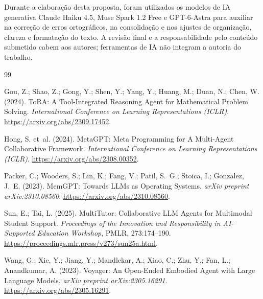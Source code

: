 \documentclass[12pt]{article}
\begin{document}
Durante a elaboração desta proposta, foram utilizados os modelos de IA generativa Claude Haiku 4.5, Muse Spark 1.2 Free e GPT-6-Astra para auxiliar na correção de erros ortográficos, na consolidação e nos ajustes de organização, clareza e formatação do texto. A revisão final e a responsabilidade pelo conteúdo submetido cabem aos autores; ferramentas de IA não integram a autoria do trabalho.
\clearpage
\begin{thebibliography}{99}

Gou, Z.; Shao, Z.; Gong, Y.; Shen, Y.; Yang, Y.; Huang, M.; Duan, N.; Chen, W. (2024).
\newblock ToRA: A Tool-Integrated Reasoning Agent for Mathematical Problem Solving.
\newblock \textit{International Conference on Learning Representations (ICLR)}.
\newblock \url{https://arxiv.org/abs/2309.17452}.

Hong, S. et~al. (2024).
\newblock MetaGPT: Meta Programming for A Multi-Agent Collaborative Framework.
\newblock \textit{International Conference on Learning Representations (ICLR)}.
\newblock \url{https://arxiv.org/abs/2308.00352}.

Packer, C.; Wooders, S.; Lin, K.; Fang, V.; Patil, S.~G.; Stoica, I.; Gonzalez, J.~E. (2023).
\newblock MemGPT: Towards LLMs as Operating Systems.
\newblock \textit{arXiv preprint arXiv:2310.08560}.
\newblock \url{https://arxiv.org/abs/2310.08560}.

Sun, E.; Tai, L. (2025).
\newblock MultiTutor: Collaborative LLM Agents for Multimodal Student Support.
\newblock \textit{Proceedings of the Innovation and Responsibility in AI-Supported Education Workshop}, PMLR, 273:174--190.
\newblock \url{https://proceedings.mlr.press/v273/sun25a.html}.

Wang, G.; Xie, Y.; Jiang, Y.; Mandlekar, A.; Xiao, C.; Zhu, Y.; Fan, L.; Anandkumar, A. (2023).
\newblock Voyager: An Open-Ended Embodied Agent with Large Language Models.
\newblock \textit{arXiv preprint arXiv:2305.16291}.
\newblock \url{https://arxiv.org/abs/2305.16291}.

\end{thebibliography}
\end{document}
